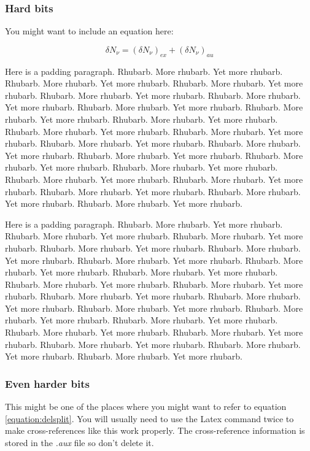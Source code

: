 \documentclass[12pt,a4paper]{article}
\begin{document}
\subsubsection{Hard bits}
You might want to include an equation here:

\begin{equation} \delta N_{\nu} = (\delta N_{\nu})_{ex} + (\delta N_{\nu})_{au} 
\label{equation:delsplit}
\end{equation}

Here is a padding paragraph.  Rhubarb.  More rhubarb.  Yet more rhubarb. 
Rhubarb.  More rhubarb.  Yet more rhubarb.  Rhubarb.  More rhubarb.  Yet
more rhubarb.  Rhubarb.  More rhubarb.  Yet more rhubarb.  Rhubarb. 
More rhubarb.  Yet more rhubarb.  Rhubarb.  More rhubarb.  Yet more
rhubarb.  Rhubarb.  More rhubarb.  Yet more rhubarb.  Rhubarb.  More
rhubarb.  Yet more rhubarb.  Rhubarb.  More rhubarb.  Yet more rhubarb. 
Rhubarb.  More rhubarb.  Yet more rhubarb.  Rhubarb.  More rhubarb.  Yet
more rhubarb.  Rhubarb.  More rhubarb.  Yet more rhubarb.  Rhubarb. 
More rhubarb.  Yet more rhubarb.  Rhubarb.  More rhubarb.  Yet more
rhubarb.  Rhubarb.  More rhubarb.  Yet more rhubarb.   Rhubarb.  More
rhubarb.  Yet more rhubarb.   Rhubarb.  More rhubarb.  Yet more
rhubarb.  Rhubarb.  More rhubarb.  Yet more rhubarb.    Rhubarb.  More
rhubarb.  Yet more rhubarb.  Rhubarb.  More rhubarb.  Yet more rhubarb. 

Here is a padding paragraph.  Rhubarb.  More rhubarb.  Yet more rhubarb. 
Rhubarb.  More rhubarb.  Yet more rhubarb.  Rhubarb.  More rhubarb.  Yet
more rhubarb.  Rhubarb.  More rhubarb.  Yet more rhubarb.  Rhubarb. 
More rhubarb.  Yet more rhubarb.  Rhubarb.  More rhubarb.  Yet more
rhubarb.  Rhubarb.  More rhubarb.  Yet more rhubarb.  Rhubarb.  More
rhubarb.  Yet more rhubarb.  Rhubarb.  More rhubarb.  Yet more rhubarb. 
Rhubarb.  More rhubarb.  Yet more rhubarb.  Rhubarb.  More rhubarb.  Yet
more rhubarb.  Rhubarb.  More rhubarb.  Yet more rhubarb.  Rhubarb. 
More rhubarb.  Yet more rhubarb.  Rhubarb.  More rhubarb.  Yet more
rhubarb.  Rhubarb.  More rhubarb.  Yet more rhubarb.   Rhubarb.  More
rhubarb.  Yet more rhubarb.   Rhubarb.  More rhubarb.  Yet more
rhubarb.  Rhubarb.  More rhubarb.  Yet more rhubarb.    Rhubarb.  More
rhubarb.  Yet more rhubarb.  Rhubarb.  More rhubarb.  Yet more rhubarb. 

\subsubsection{Even harder bits}
This might be one of the places where you might want to refer to
equation \ref{equation:delsplit}. You will usually need to use the
Latex command twice to make cross-references like this work properly.
The cross-reference information is stored in the {\em .aux} file so don't
delete it.
\end{document}
